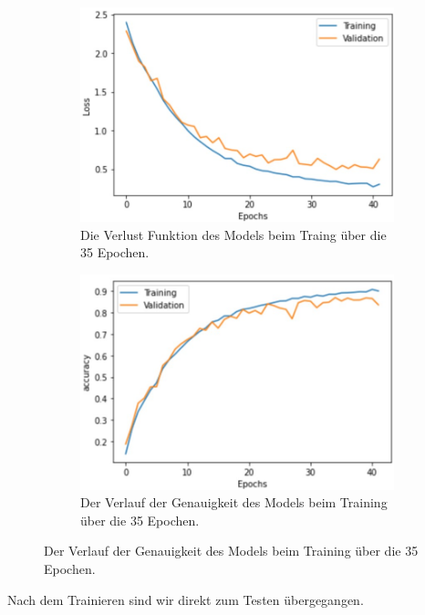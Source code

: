 \begin{figure}
    \centering
    \caption{Der Verlauf der Verlust Funktion und der Genauigkeit über die 35 Trainingsepochen.}
    \begin{subfigure}{0.40\textwidth}
        \includegraphics[width=\linewidth]{content/data/loss.JPG}
        \caption{Die Verlust Funktion des Models beim Traing über die 35 Epochen.}
        \label{fig:loss}
    \end{subfigure}\hfill
    \begin{subfigure}{0.40\textwidth}
        \includegraphics[width=\linewidth]{content/data/accuracy.JPG}
        \caption{Der Verlauf der Genauigkeit des Models beim Training über die 35 Epochen.}
        \label{fig:accuracy}
    \end{subfigure}
    \label{fig:training}
\end{figure}
Nach dem Trainieren sind wir direkt zum Testen übergegangen.